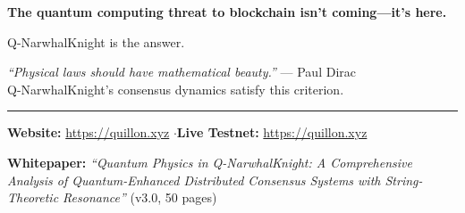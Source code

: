 \documentclass[11pt,a4paper]{article}
\begin{document}
\vspace{1cm}

\begin{center}
\begin{tcolorbox}[
    enhanced,
    colback=qnkpurple!8,
    colframe=qnkpurple,
    boxrule=1.5pt,
    arc=8pt,
    width=14cm,
    shadow={2mm}{-2mm}{0mm}{black!20}
]
\begin{center}
{\Large\bfseries\textcolor{qnkpurple}{The quantum computing threat to blockchain isn't coming---it's here.}}

\vspace{0.5cm}

{\large\textcolor{qnkslate}{Q-NarwhalKnight is the answer.}}

\vspace{0.5cm}

{\small\textcolor{qnkslate}{
\textit{``Physical laws should have mathematical beauty.''} --- Paul Dirac\\[6pt]
Q-NarwhalKnight's consensus dynamics satisfy this criterion.
}}
\end{center}
\end{tcolorbox}
\end{center}

\vfill

\begin{center}
\textcolor{qnkslate}{\rule{8cm}{0.5pt}}

\vspace{0.3cm}

{\small
\textbf{Website:} \url{https://quillon.xyz} \quad$\cdot$\quad \textbf{Live Testnet:} \url{https://quillon.xyz}

\vspace{0.2cm}

\textbf{Whitepaper:} \textit{``Quantum Physics in Q-NarwhalKnight: A Comprehensive Analysis of Quantum-Enhanced Distributed Consensus Systems with String-Theoretic Resonance''} (v3.0, 50 pages)
}
\end{center}
\end{document}
